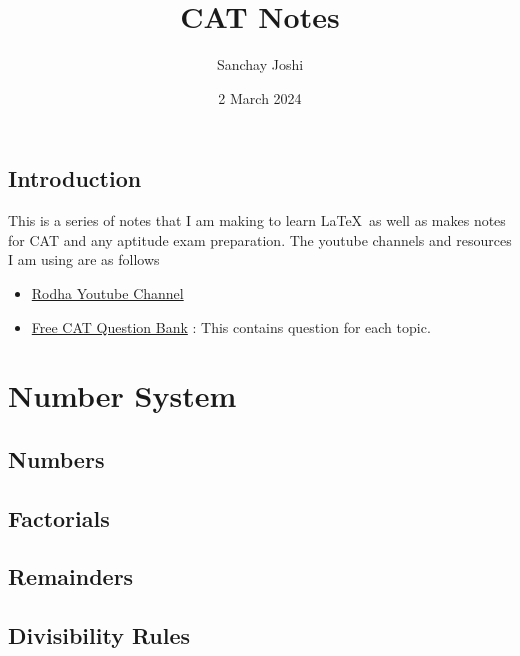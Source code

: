 \documentclass{book}
\title{CAT Notes}
\author{Sanchay Joshi}
\date{2 March 2024}
\begin{document}
\maketitle
\tableofcontents
\newpage



\chapter*{Introduction}
This is a series of notes that I am making to learn \LaTeX \, as well as makes notes for CAT and any aptitude exam preparation. The youtube channels and resources I am using are as follows

\begin{itemize}
    \item \href{https://www.youtube.com/@Rodha/playlists}{Rodha Youtube Channel}
    \item \href{https://iim-cat-questions-answers.2iim.com/}{Free CAT Question Bank} : This contains question for each topic. 
\end{itemize}

\part{Number System}


\chapter{Numbers}


\chapter{Factorials}


\chapter{Remainders}


\chapter{Divisibility Rules}

\end{document}
